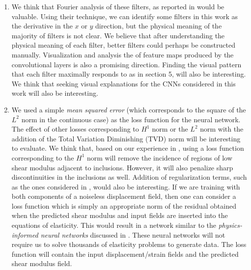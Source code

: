 \documentclass[12pt]{article}
\begin{document}
\begin{enumerate}
\item{We think that Fourier analysis of these filters, as reported in \cite{paper:pateloberai2019} would be valuable. Using their technique, we can identify some filters in this work as the derivative in the $x$ or $y$ direction, but the physical meaning of the majority of filters is not clear. We believe that after understanding the physical meaning of each filter, better filters could perhaps be constructed manually. Visualization and analysis the of feature maps produced by the convolutional layers is also a promising direction. Finding the visual pattern that each filter maximally responds to as in \cite{book:chollet} section 5, will also be interesting. We think that seeking visual explanations \cite{paper:selvaraju_2019} for the CNNs considered in this work will also be interesting.}
\item{We used a simple \textit{mean squared error} (which corresponds to the square of the $L^2$ norm in the continuous case) as the loss function for the neural network. The effect of other losses corresponding to $H^1$ norm or the $L^2$ norm with the addition of the Total Variation Diminishing (TVD) norm will be interesting to evaluate. We think that, based on our experience in \cite{diss:gokhale2007}, using a loss function corresponding to the $H^1$ norm will remove the incidence of regions of low shear modulus adjacent to inclusions. However, it will also penalize sharp discontinuities in the inclusions as well. Addition of regularization terms, such as the ones considered in \cite{diss:gokhale2007}, would also be interesting. If we are training with both components of a noiseless displacement field, then one can consider a loss function which is simply an appropriate norm of the  residual obtained when the predicted shear modulus and input fields are inserted into the equations of elasticity. This would result in a network similar to the \textit{physics-informed neural networks} discussed in \cite{paper:pinnkarniadakis}. These neural networks will not require us to solve thousands of elasticity problems to generate data. The loss function will contain the input displacement/strain fields and the predicted shear modulus field.}

\end{enumerate}
\end{document}
